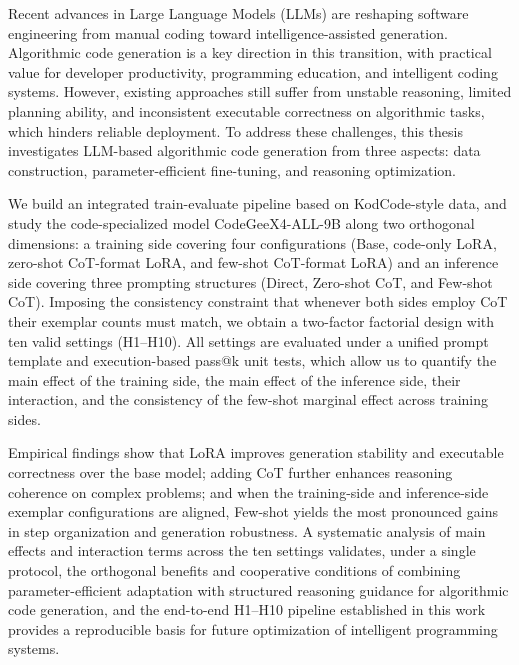 \documentclass[
    decl-page,  %
  ]{njuthesis}
\begin{document}
\begin{abstract*}
  Recent advances in Large Language Models (LLMs) are reshaping software engineering from manual coding toward intelligence-assisted generation. Algorithmic code generation is a key direction in this transition, with practical value for developer productivity, programming education, and intelligent coding systems. However, existing approaches still suffer from unstable reasoning, limited planning ability, and inconsistent executable correctness on algorithmic tasks, which hinders reliable deployment. To address these challenges, this thesis investigates LLM-based algorithmic code generation from three aspects: data construction, parameter-efficient fine-tuning, and reasoning optimization.

  We build an integrated train-evaluate pipeline based on KodCode-style data, and study the code-specialized model CodeGeeX4-ALL-9B along two orthogonal dimensions: a training side covering four configurations (Base, code-only LoRA, zero-shot CoT-format LoRA, and few-shot CoT-format LoRA) and an inference side covering three prompting structures (Direct, Zero-shot CoT, and Few-shot CoT). Imposing the consistency constraint that whenever both sides employ CoT their exemplar counts must match, we obtain a two-factor factorial design with ten valid settings (H1–H10). All settings are evaluated under a unified prompt template and execution-based pass@k unit tests, which allow us to quantify the main effect of the training side, the main effect of the inference side, their interaction, and the consistency of the few-shot marginal effect across training sides.

  Empirical findings show that LoRA improves generation stability and executable correctness over the base model; adding CoT further enhances reasoning coherence on complex problems; and when the training-side and inference-side exemplar configurations are aligned, Few-shot yields the most pronounced gains in step organization and generation robustness. A systematic analysis of main effects and interaction terms across the ten settings validates, under a single protocol, the orthogonal benefits and cooperative conditions of combining parameter-efficient adaptation with structured reasoning guidance for algorithmic code generation, and the end-to-end H1–H10 pipeline established in this work provides a reproducible basis for future optimization of intelligent programming systems.
\end{abstract*}

\tableofcontents
\listoffigures
\listoftables
\end{document}
